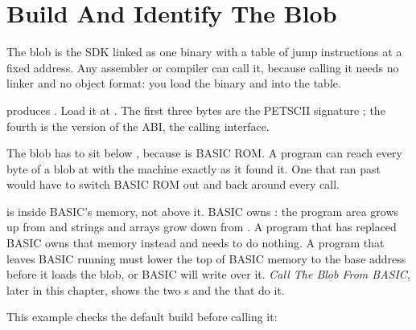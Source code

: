 

\section{Build And Identify The Blob}

The blob is the SDK linked as one binary with a table of jump instructions at
a fixed address. Any assembler or compiler can call it, because calling it
needs no linker and no object format: you load the binary and  into
the table.

 produces . Load it
at . The first three bytes are the PETSCII signature ;
the fourth is the version of the ABI, the calling interface.

\begin{note}
The blob has to sit below , because  is BASIC
ROM. A program can reach every byte of a blob at  with the machine
exactly as it found it. One that ran past  would have to switch
BASIC ROM out and back around every call.
\end{note}

\begin{warning}
 is inside BASIC's memory, not above it. BASIC owns
: the program area grows up from  and strings
and arrays grow down from . A program that has replaced BASIC owns
that memory instead and needs to do nothing. A program that leaves BASIC running
must lower the top of BASIC memory to the base address before it loads the blob,
or BASIC will write over it. \emph{Call The Blob From BASIC}, later in this
chapter, shows the two s and the  that do it.
\end{warning}

This example checks the default build before calling it:

